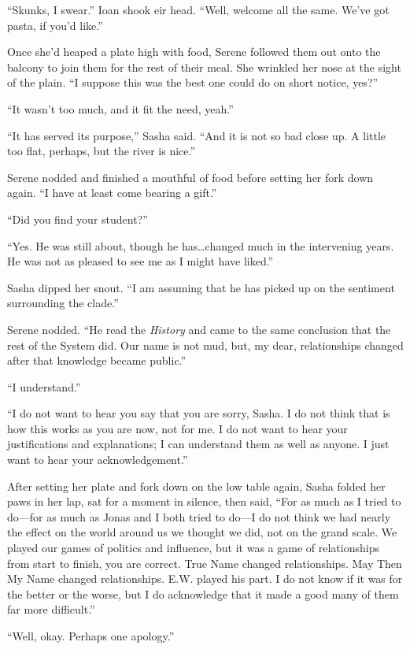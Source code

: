 ``Skunks, I swear.'' Ioan shook eir head. ``Well, welcome all the same. We've got pasta, if you'd like.''

Once she'd heaped a plate high with food, Serene followed them out onto the balcony to join them for the rest of their meal. She wrinkled her nose at the sight of the plain. ``I suppose this was the best one could do on short notice, yes?''

``It wasn't too much, and it fit the need, yeah.''

``It has served its purpose,'' Sasha said. ``And it is not so bad close up. A little too flat, perhaps, but the river is nice.''

Serene nodded and finished a mouthful of food before setting her fork down again. ``I have at least come bearing a gift.''

``Did you find your student?''

``Yes. He was still about, though he has\ldots changed much in the intervening years. He was not as pleased to see me as I might have liked.''

Sasha dipped her snout. ``I am assuming that he has picked up on the sentiment surrounding the clade.''

Serene nodded. ``He read the \emph{History} and came to the same conclusion that the rest of the System did. Our name is not mud, but, my dear, relationships changed after that knowledge became public.''

``I understand.''

``I do not want to hear you say that you are sorry, Sasha. I do not think that is how this works as you are now, not for me. I do not want to hear your justifications and explanations; I can understand them as well as anyone. I just want to hear your acknowledgement.''

After setting her plate and fork down on the low table again, Sasha folded her paws in her lap, sat for a moment in silence, then said, ``For as much as I tried to do—for as much as Jonas and I both tried to do—I do not think we had nearly the effect on the world around us we thought we did, not on the grand scale. We played our games of politics and influence, but it was a game of relationships from start to finish, you are correct. True Name changed relationships. May Then My Name changed relationships. E.W. played his part. I do not know if it was for the better or the worse, but I do acknowledge that it made a good many of them far more difficult.''

``Well, okay. Perhaps one apology.''

